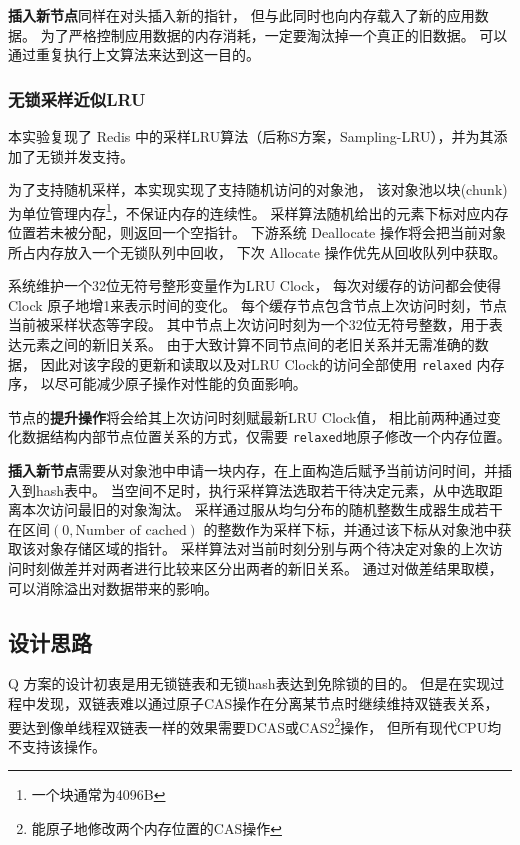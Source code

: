 \textbf{插入新节点}同样在对头插入新的指针，
但与此同时也向内存载入了新的应用数据。
为了严格控制应用数据的内存消耗，一定要淘汰掉一个真正的旧数据。
可以通过重复执行上文算法来达到这一目的。

\subsubsection{无锁采样近似LRU}

本实验复现了 Redis 中的采样LRU算法（后称S方案，Sampling-LRU），并为其添加了无锁并发支持。

为了支持随机采样，本实现实现了支持随机访问的对象池，
该对象池以块(chunk)为单位管理内存\footnote{一个块通常为4096B}，不保证内存的连续性。
采样算法随机给出的元素下标对应内存位置若未被分配，则返回一个空指针。
下游系统 Deallocate 操作将会把当前对象所占内存放入一个无锁队列中回收，
下次 Allocate 操作优先从回收队列中获取。

系统维护一个32位无符号整形变量作为LRU Clock，
每次对缓存的访问都会使得Clock 原子地增1来表示时间的变化。
每个缓存节点包含节点上次访问时刻，节点当前被采样状态等字段。
其中节点上次访问时刻为一个32位无符号整数，用于表达元素之间的新旧关系。
由于大致计算不同节点间的老旧关系并无需准确的数据，
因此对该字段的更新和读取以及对LRU Clock的访问全部使用 \verb|relaxed| 内存序，
以尽可能减少原子操作对性能的负面影响。

节点的\textbf{提升操作}将会给其上次访问时刻赋最新LRU Clock值，
相比前两种通过变化数据结构内部节点位置关系的方式，仅需要 \verb|relaxed|地原子修改一个内存位置。

\textbf{插入新节点}需要从对象池中申请一块内存，在上面构造后赋予当前访问时间，并插入到hash表中。
当空间不足时，执行采样算法选取若干待决定元素，从中选取距离本次访问最旧的对象淘汰。
采样通过服从均匀分布的随机整数生成器生成若干在区间$\allowbreak (0, \mbox{Number of cached})$
的整数作为采样下标，并通过该下标从对象池中获取该对象存储区域的指针。
采样算法对当前时刻分别与两个待决定对象的上次访问时刻做差并对两者进行比较来区分出两者的新旧关系。
通过对做差结果取模，可以消除溢出对数据带来的影响。

\subsection{设计思路}

Q 方案的设计初衷是用无锁链表和无锁hash表达到免除锁的目的。
但是在实现过程中发现，双链表难以通过原子CAS操作在分离某节点时继续维持双链表关系，
要达到像单线程双链表一样的效果需要DCAS或CAS2\footnote{能原子地修改两个内存位置的CAS操作}操作，
但所有现代CPU均不支持该操作。

